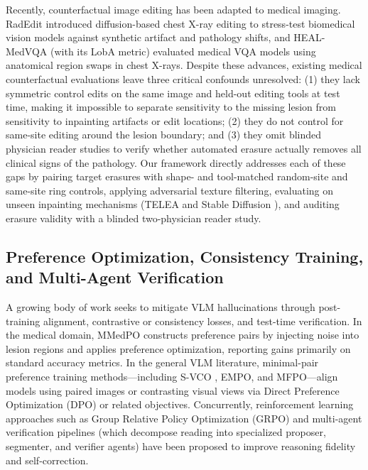 \documentclass{article} %
\begin{document}
Recently, counterfactual image editing has been adapted to medical imaging. RadEdit \citep{perez2024radedit} introduced diffusion-based chest X-ray editing to stress-test biomedical vision models against synthetic artifact and pathology shifts, and HEAL-MedVQA (with its LobA metric) \citep{healmedvqa2024} evaluated medical VQA models using anatomical region swaps in chest X-rays. Despite these advances, existing medical counterfactual evaluations leave three critical confounds unresolved: (1) they lack symmetric control edits on the same image and held-out editing tools at test time, making it impossible to separate sensitivity to the missing lesion from sensitivity to inpainting artifacts or edit locations; (2) they do not control for same-site editing around the lesion boundary; and (3) they omit blinded physician reader studies to verify whether automated erasure actually removes all clinical signs of the pathology. Our framework directly addresses each of these gaps by pairing target erasures with shape- and tool-matched random-site and same-site ring controls, applying adversarial texture filtering, evaluating on unseen inpainting mechanisms (TELEA \citep{telea2004image} and Stable Diffusion \citep{rombach2022high}), and auditing erasure validity with a blinded two-physician reader study.

\subsection{Preference Optimization, Consistency Training, and Multi-Agent Verification}
\label{subsec:rw_alignment}
A growing body of work seeks to mitigate VLM hallucinations through post-training alignment, contrastive or consistency losses, and test-time verification. In the medical domain, MMedPO \citep{zhu2024mmedpo} constructs preference pairs by injecting noise into lesion regions and applies preference optimization, reporting gains primarily on standard accuracy metrics. In the general VLM literature, minimal-pair preference training methods---including S-VCO \citep{svco2024}, EMPO, and MFPO---align models using paired images or contrasting visual views via Direct Preference Optimization (DPO) \citep{rafailov2023dpo} or related objectives. Concurrently, reinforcement learning approaches such as Group Relative Policy Optimization (GRPO) \citep{shao2024deepseekmath} and multi-agent verification pipelines (which decompose reading into specialized proposer, segmenter, and verifier agents) have been proposed to improve reasoning fidelity and self-correction.
\end{document}
